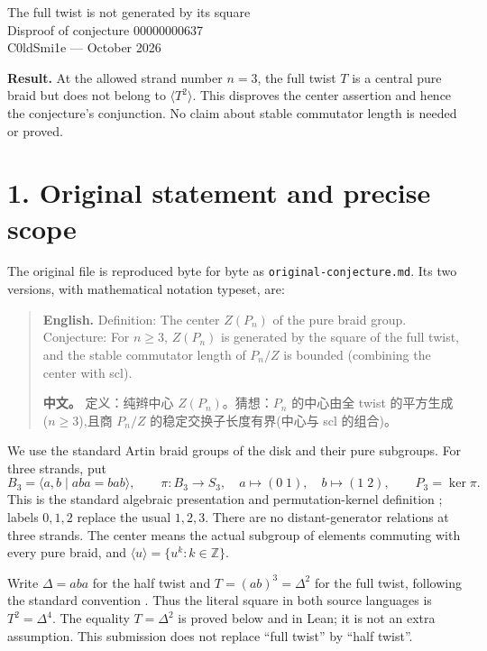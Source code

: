 \documentclass[10pt]{article}
\newcommand{\lean}[1]{\nolinkurl{#1}}
\newcommand{\Z}{\mathbb Z}
\begin{document}
\begin{center}
{\LARGE The full twist is not generated by its square}\\[5pt]
{\large Disproof of conjecture 00000000637}\\[5pt]
C0ldSmi1e \quad ---  October 2026
\end{center}

\textbf{Result.} At the allowed strand number $n=3$, the full twist $T$ is a
central pure braid but does not belong to $\langle T^2\rangle$. This disproves
the center assertion and hence the conjecture's conjunction. No claim about
stable commutator length is needed or proved.

\section*{1. Original statement and precise scope}
The original file is reproduced byte for byte as \lean{original-conjecture.md}.
Its two versions, with mathematical notation typeset, are:
\begin{quote}
\textbf{English.} Definition: The center $Z(P_n)$ of the pure braid group.
Conjecture: For $n\geq3$, $Z(P_n)$ is generated by the square of the full twist,
and the stable commutator length of $P_n/Z$ is bounded (combining the center
with scl).

\textbf{中文。} 定义：纯辫中心 $Z(P_n)$。猜想：$P_n$ 的中心由全 twist 的平方生成
($n\geq3$),且商 $P_n/Z$ 的稳定交换子长度有界(中心与 scl 的组合)。
\end{quote}

We use the standard Artin braid groups of the disk and their pure subgroups.
For three strands, put
\[
 B_3=\langle a,b\mid aba=bab\rangle,\qquad
 \pi:B_3\longrightarrow S_3,\quad a\mapsto(0\;1),\quad b\mapsto(1\;2),
 \qquad P_3=\ker\pi.
\]
This is the standard algebraic presentation and permutation-kernel definition
\cite{tw,gm}; labels $0,1,2$ replace the usual $1,2,3$.
There are no distant-generator relations at three strands.
The center means the actual subgroup of elements commuting with every pure
braid, and $\langle u\rangle=\{u^k:k\in\Z\}$.

Write $\Delta=aba$ for the half twist and $T=(ab)^3=\Delta^2$ for the
full twist, following the standard convention \cite{bggm}.
Thus the literal square in both source languages is $T^2=\Delta^4$.
The equality $T=\Delta^2$ is proved below and in Lean; it is not an extra
assumption. This submission does not replace ``full twist'' by ``half twist''.
\end{document}
